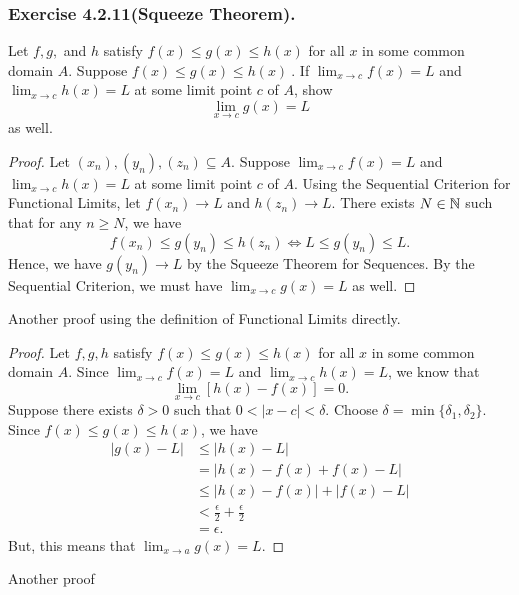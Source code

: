 \subsubsection{Exercise 4.2.11(Squeeze Theorem).} Let \( f,g, \) and \( h \) satisfy \( f(x) \leq g(x) \leq h(x) \) for all \( x  \) in some common domain \( A  \). Suppose \( f(x) \leq g(x) \leq h(x) \ \). If \( \lim_{ x \to c  } f(x) = L  \) and \( \lim_{ x \to c } h(x) = L  \) at some limit point \( c \) of \( A  \), show 
\[  \lim_{ x \to c } g(x) = L  \] as well.
\begin{proof}
Let \( (x_n), (y_n), (z_n) \subseteq A   \). Suppose \( \lim_{ x \to c } f(x) = L  \) and \( \lim_{ x \to c } h(x) = L  \) at some limit point \( c \) of \( A  \). Using the Sequential Criterion for Functional Limits, let \( f(x_n) \to L  \) and \( h(z_n) \to L  \). There exists \( N \in \mathbb{N}  \) such that for any \( n \geq N  \), we have 
\[ f(x_n) \leq g(y_n) \leq h(z_n) \iff L \leq g(y_n) \leq L. \]
Hence, we have \( g(y_n) \to L  \) by the Squeeze Theorem for Sequences. By the Sequential Criterion, we must have \( \lim_{ x \to c } g(x) = L  \) as well.
\end{proof}

Another proof using the definition of Functional Limits directly.

\begin{proof}
Let \( f, g, h \) satisfy \( f(x) \leq g(x) \leq h(x) \) for all \( x  \) in some common domain \( A  \). Since \( \lim_{ x \to c } f(x) = L  \) and \( \lim_{ x \to c } h(x) = L  \), we know that 
\[ \lim_{ x \to c } [h(x) - f(x)] = 0.  \]
Suppose there exists \( \delta > 0  \) such that \(  0 < | x - c  | < \delta  \). Choose \( \delta = \min \{ \delta_1, \delta_2  \}  \). Since \( f(x) \leq g(x) \leq h(x) \), we have 
\begin{align*}
    | g(x) - L  | &\leq | h(x) - L  |  \\
                  &= | h(x) - f(x) + f(x) - L  | \\
                  &\leq | h(x) - f(x)  | + |  f(x) - L  | \\
                  &< \frac{ \epsilon  }{ 2 } + \frac{ \epsilon  }{ 2 } \\
                  &= \epsilon.
\end{align*}
But, this means that \( \lim_{ x \to a } g(x) = L.  \)
\end{proof}

Another proof 


